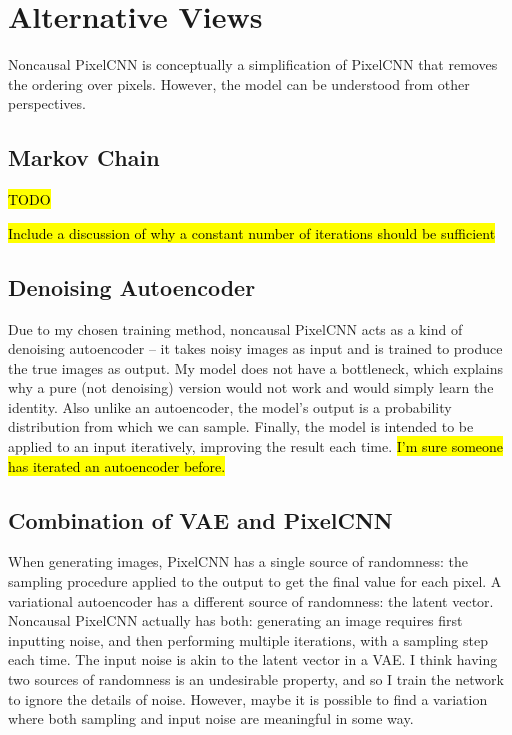 \documentclass[11pt, a4paper]{book}
\begin{document}
\section{Alternative Views}

Noncausal PixelCNN is conceptually a simplification of PixelCNN that removes the ordering over pixels. However, the model can be understood from other perspectives.

\subsection{Markov Chain} \label{markovchain}

\hl{TODO}

\hl{Include a discussion of why a constant number of iterations should be sufficient}

\citep{brnndenoise}

\subsection{Denoising Autoencoder}

Due to my chosen training method, noncausal PixelCNN acts as a kind of denoising autoencoder \citep{denoisingautoencoder, stackeddenoising} -- it takes noisy images as input and is trained to produce the true images as output. My model does not have a bottleneck, which explains why a pure (not denoising) version would not work and would simply learn the identity. Also unlike an autoencoder, the model's output is a probability distribution from which we can sample. Finally, the model is intended to be applied to an input iteratively, improving the result each time. \hl{I'm sure someone has iterated an autoencoder before.}

\subsection{Combination of VAE and PixelCNN}

When generating images, PixelCNN has a single source of randomness: the sampling procedure applied to the output to get the final value for each pixel. A variational autoencoder \citep{vae} has a different source of randomness: the latent vector. Noncausal PixelCNN actually has both: generating an image requires first inputting noise, and then performing multiple iterations, with a sampling step each time. The input noise is akin to the latent vector in a VAE. I think having two sources of randomness is an undesirable property, and so I train the network to ignore the details of noise. However, maybe it is possible to find a variation where both sampling and input noise are meaningful in some way.
\end{document}
